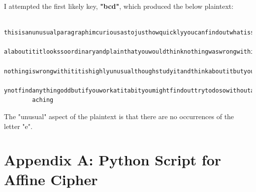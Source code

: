 \documentclass{article}
\begin{document}
I attempted the first likely key, \textbf{"bcd"}, which produced the below plaintext:
	\begin{verbatim}
        thisisanunusualparagraphimcuriousastojusthowquicklyyoucanfindoutwhatissounusu
        alaboutititlookssoordinaryandplainthatyouwouldthinknothingwaswrongwithitinfact
        nothingiswrongwithititishighlyunusualthoughstudyitandthinkaboutitbutyoustillma
        ynotfindanythingoddbutifyouworkatitabityoumightfindouttrytodosowithoutanyco
        aching
	\end{verbatim}
The "unusual" aspect of the plaintext is that there are no occurrences of the letter "e".

\printbibliography

\newpage
\section*{Appendix A:  Python Script for Affine Cipher}

\end{document}
